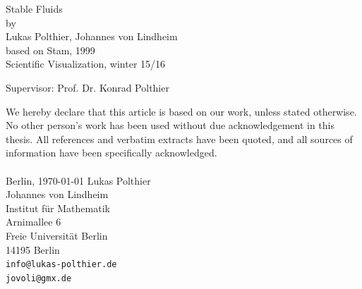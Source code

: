 \documentclass[a4paper,10pt,oneside,final,german,openbib,pdftex,titlepage]{scrbook}
\begin{document}

\linespread{0.9}

\begin{titlepage}

  \vspace*{6mm}
  \begin{center}
     {\afont Stable Fluids}
     \\[3.5cm]
     {\large by}
     \\[3.5cm]
     {\dfont Lukas Polthier, Johannes von Lindheim}\\
     {based on Stam, 1999}
     \\[2cm]
     {\large Scientific Visualization, winter 15/16\/\\
}
   \end{center}
   \vfill
   Supervisor: Prof. Dr. Konrad Polthier\\	
   \vfill
   
   
\end{titlepage}

\newpage
\mbox{}
\thispagestyle{empty}

\newpage
\thispagestyle{empty}
We hereby declare that this article is based on our work, unless stated otherwise. No other person’s work has been used without due acknowledgement in this thesis. All references and verbatim extracts have been quoted, and all sources of information have been specifically acknowledged.
\\
\\[3.5cm] 
Berlin, \today
\vfill
\noindent 
Lukas Polthier\\
Johannes von Lindheim\\
Institut f\"ur Mathematik\\
Arnimallee 6\\
Freie Universit\"at Berlin\\
14195 Berlin\\
{\tt info@lukas-polthier.de\\
\tt jovoli@gmx.de}

\thispagestyle{empty}
\renewcommand\contentsname{Table of Contents}
\thispagestyle{empty}
\renewcommand\figurename{Figure}
\renewcommand\tablename{Tabelle}
\thispagestyle{empty}
\tableofcontents
\thispagestyle{empty}
\clearpage
\thispagestyle{empty}
\end{document}
